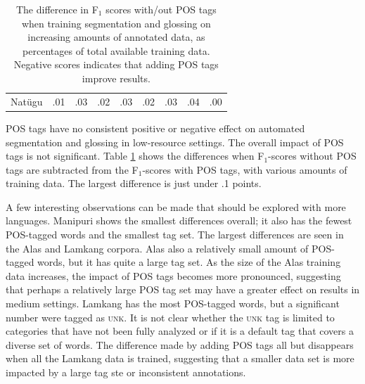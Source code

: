 \begin{table}[b]
\begin{tabular}{l|cccccccc}
       Nat\"ugu & .01 & .03 & .02 & .03 & .02 & .03 & .04 & .00 \\
    \end{tabular}
    \caption[Segmenting and Glossing with/out POS tags]{The difference in F$_1$ scores with/out POS tags when training segmentation and glossing on increasing amounts of annotated data, as percentages of total available training data. Negative scores indicates that adding POS tags improve results.
    }
    \label{tab:POSSG}
\end{table}

POS tags have no consistent positive or negative effect on automated segmentation and glossing in low-resource settings. The overall impact of POS tags is not significant. Table \ref{tab:POSSG} shows the differences when F$_1$-scores without POS tags are subtracted from the F$_1$-scores with POS tags, with various amounts of training data. The largest difference is just under .1 points. 

A few interesting observations can be made that should be explored with more languages. Manipuri shows the smallest differences overall; it also has the fewest POS-tagged words and the smallest tag set. The largest differences are seen in the Alas and Lamkang corpora. Alas also a relatively small amount of POS-tagged words, but it has quite a large tag set. As the size of the Alas training data increases, the impact of POS tags becomes more pronounced, suggesting that perhaps a relatively large POS tag set may have a greater effect on results in medium settings. Lamkang has the most POS-tagged words, but a significant number were tagged as \textsc{unk}. It is not clear whether the \textsc{unk} tag is limited to categories that have not been fully analyzed or if it is a default tag that covers a diverse set of words. The difference made by adding POS tags all but disappears when all the Lamkang data is trained, suggesting that a smaller data set is more impacted by a large tag ste or inconsistent annotations.

